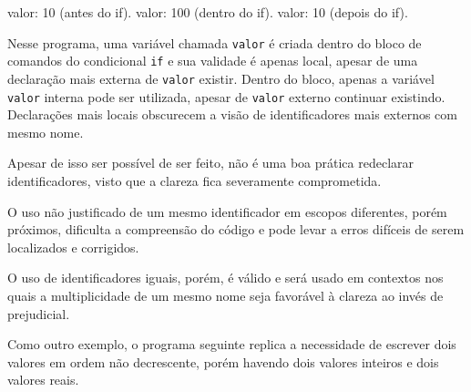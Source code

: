 \documentclass[
  11pt,
  a4paper,
]{scrbook}
\newenvironment{Shaded}{\begin{snugshade}}{\end{snugshade}}
\newcommand{\NormalTok}[1]{#1}
\begin{document}
\begin{Shaded}
\begin{Highlighting}[]
\NormalTok{valor: 10 (antes do if).}
\NormalTok{valor: 100 (dentro do if).}
\NormalTok{valor: 10 (depois do if).}
\end{Highlighting}
\end{Shaded}

Nesse programa, uma variável chamada \texttt{valor} é criada dentro do
bloco de comandos do condicional \texttt{if} e sua validade é apenas
local, apesar de uma declaração mais externa de \texttt{valor} existir.
Dentro do bloco, apenas a variável \texttt{valor} interna pode ser
utilizada, apesar de \texttt{valor} externo continuar existindo.
Declarações mais locais obscurecem a visão de identificadores mais
externos com mesmo nome.

Apesar de isso ser possível de ser feito, não é uma boa prática
redeclarar identificadores, visto que a clareza fica severamente
comprometida.

\begin{tcolorbox}[enhanced jigsaw, arc=.35mm, bottomtitle=1mm, colbacktitle=quarto-callout-tip-color!10!white, title=\textcolor{quarto-callout-tip-color}{\faLightbulb}\hspace{0.5em}{Dica}, toprule=.15mm, left=2mm, opacityback=0, colback=white, colframe=quarto-callout-tip-color-frame, opacitybacktitle=0.6, bottomrule=.15mm, leftrule=.75mm, toptitle=1mm, coltitle=black, titlerule=0mm, rightrule=.15mm, breakable]

O uso não justificado de um mesmo identificador em escopos diferentes,
porém próximos, dificulta a compreensão do código e pode levar a erros
difíceis de serem localizados e corrigidos.

O uso de identificadores iguais, porém, é válido e será usado em
contextos nos quais a multiplicidade de um mesmo nome seja favorável à
clareza ao invés de prejudicial.

\end{tcolorbox}

Como outro exemplo, o programa seguinte replica a necessidade de
escrever dois valores em ordem não decrescente, porém havendo dois
valores inteiros e dois valores reais.
\end{document}
